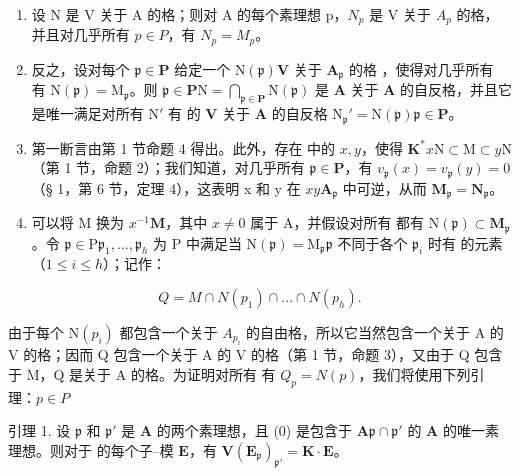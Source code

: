 \begin{enumerate}
\def\labelenumi{(\roman{enumi})}
\item
  设 N 是 V 关于 A 的格；则对 A 的每个素理想 p，\(N_{p}\) 是 V 关于 \(A_{p}\) 的格，并且对几乎所有 \(p \in P\)，有 \(N_{p} = M_{p}\)。
\item
  反之，设对每个 \(\mathfrak{p} \in \mathbf{P}\) 给定一个 \(\mathrm{N}(\mathfrak{p})\)\(\mathbf{V}\) 关于 \(\mathbf{A}_{\mathfrak{p}}\) 的格 ，使得对几乎所有  有 \(\mathrm{N}(\mathfrak{p}) = \mathrm{M}_{\mathfrak{p}}\)。则 \(\mathfrak{p} \in \mathbf{P}\)\(\mathrm{N} = \bigcap_{\mathfrak{p} \in \mathbf{P}} \mathrm{N}(\mathfrak{p})\) 是 \(\mathbf{A}\) 关于 \(\mathbf{A}\) 的自反格，并且它是唯一满足对所有 \(\mathrm{N}'\) 有  的 \(\mathbf{V}\) 关于 \(\mathbf{A}\) 的自反格 \(\mathrm{N}_{\mathfrak{p}}' = \mathrm{N}(\mathfrak{p})\)\(\mathfrak{p} \in \mathbf{P}\)。
\item
  第一断言由第 1 节命题 4 得出。此外，存在  中的 \(x, y\)，使得 \(\mathbf{K}^*\)\(x\mathrm{N} \subset \mathrm{M} \subset y\mathrm{N}\)（第 1 节，命题 2）；我们知道，对几乎所有 \(\mathfrak{p} \in \mathbf{P}\)，有 \(v_{\mathfrak{p}}(x) = v_{\mathfrak{p}}(y) = 0\)（§ 1，第 6 节，定理 4），这表明 x 和 y 在 \(x\)\(y\)\(\mathbf{A}_{\mathfrak{p}}\) 中可逆，从而 \(\mathbf{M}_{\mathfrak{p}} = \mathbf{N}_{\mathfrak{p}}\)。
\item
  可以将 M 换为 \(x^{-1}\mathbf{M}\)，其中 \(x \neq 0\) 属于 A，并假设对所有  都有 \(\mathrm{N}(\mathfrak{p}) \subset \mathbf{M}_{\mathfrak{p}}\)。令 \(\mathfrak{p} \in \mathrm{P}\)\(\mathfrak{p}_1, \ldots, \mathfrak{p}_h\) 为 P 中满足当 \(\mathrm{N}(\mathfrak{p}) = \mathrm{M}_{\mathfrak{p}}\)\(\mathfrak{p}\) 不同于各个 \(\mathfrak{p}_i\) 时有  的元素（\(1 \leqslant i \leqslant h\)）；记作：
\end{enumerate}

\[
Q = M \cap N (p _ {1}) \cap \dots \cap N (p _ {h}).
\]

由于每个 \(\mathrm{N}(p_{i})\) 都包含一个关于 \(A_{p_{i}}\) 的自由格，所以它当然包含一个关于 A 的 V 的格；因而 Q 包含一个关于 A 的 V 的格（第 1 节，命题 3），又由于 Q 包含于 M，Q 是关于 A 的格。为证明对所有  有 \(Q_{p} = N(p)\)，我们将使用下列引理：\(p \in P\)

引理 1. 设 \(\mathfrak{p}\) 和 \(\mathfrak{p}'\) 是 \(\mathbf{A}\) 的两个素理想，且 (0) 是包含于 \(\mathbf{A}\)\(\mathfrak{p} \cap \mathfrak{p}'\) 的 \(\mathbf{A}\) 的唯一素理想。则对于  的每个子--模 \(\mathbf{E}\)，有 \(\mathbf{V}\)\((\mathbf{E}_{\mathfrak{p}})_{\mathfrak{p}'} = \mathbf{K} \cdot \mathbf{E}\)。

